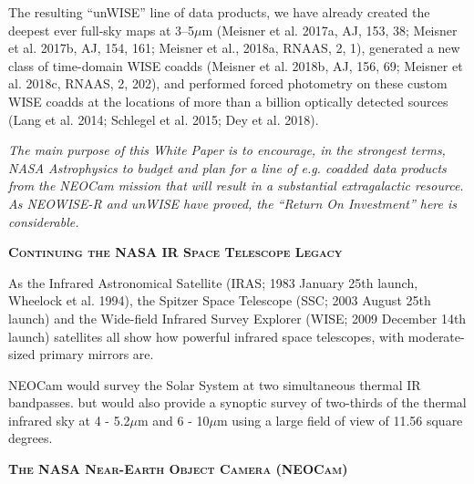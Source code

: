 \documentclass[12pt]{article}
\begin{document}
\smallskip
\noindent
The resulting ``unWISE'' line of data products, we have already created the deepest ever full-sky maps at 3–5$\mu$m 
(Meisner et al. 2017a, AJ, 153, 38;  
Meisner et al. 2017b, AJ, 154, 161; 
Meisner et al., 2018a, RNAAS, 2, 1), 
generated a new class of time-domain WISE coadds 
(Meisner et al.  2018b, AJ, 156, 69; 
Meisner et al.  2018c, RNAAS, 2, 202), and performed forced photometry on these custom WISE coadds at the locations of more than a billion optically detected sources
 (Lang et al. 2014; Schlegel et al. 2015; Dey et al. 2018).

\smallskip
\noindent
{\it The main purpose of this White Paper is to encourage, in the strongest terms, NASA Astrophysics to 
budget and plan for a line of e.g. coadded data products from the NEOCam mission that will result in a substantial extragalactic resource. As NEOWISE-R and unWISE have proved, the ``Return On Investment'' here is considerable.}


\smallskip
\smallskip
\noindent
{\bfseries \textsc{\textcolor{Cerulean}{Continuing the NASA IR Space Telescope Legacy}}} 

\smallskip
\noindent
As the Infrared Astronomical Satellite (IRAS; 1983 January 25th launch, Wheelock et al. 1994), 
the Spitzer Space Telescope (SSC; 2003 August 25th launch) and the Wide-field
Infrared Survey Explorer (WISE; 2009 December 14th launch) satellites all show 
how powerful infrared space telescopes, with moderate-sized primary mirrors are.

\smallskip
\smallskip
\noindent
NEOCam would survey the Solar System at two simultaneous thermal IR bandpasses. 
but would also provide a synoptic survey of two-thirds of the thermal infrared sky at 4 - 5.2$\mu$m and  6 - 10$\mu$m using a large field of view of 11.56 square degrees. 



\smallskip
\smallskip
\noindent
{\bfseries \textsc{\textcolor{Cerulean}{The NASA Near-Earth Object Camera (NEOCam)}}}
\end{document}
